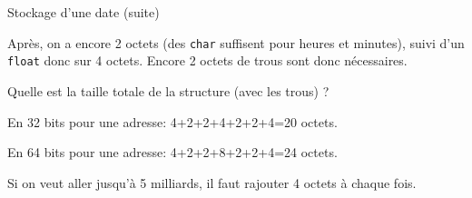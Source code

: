 \begin{exercice}
\begin{exercicelet}{Stockage d'une date (suite)}
\begin{questions}
\begin{xcorrection}
        Après, on a encore 2 octets (des \texttt{char} suffisent pour heures
        et minutes), suivi d'un \texttt{float} donc sur 4 octets. Encore 2
        octets de trous sont donc nécessaires.
      \end{xcorrection}
    \item Quelle est la taille totale de la structure (avec les trous) ?
      \begin{xcorrection}
        En 32 bits pour une adresse: 4+2+2+4+2+2+4=20 octets.

        En 64 bits pour une adresse: 4+2+2+8+2+2+4=24 octets.

        Si on veut aller jusqu'à 5 milliards, il faut rajouter 4 octets à
        chaque fois.
      \end{xcorrection}
    \end{questions}
  \end{exercicelet}
\end{exercice}
